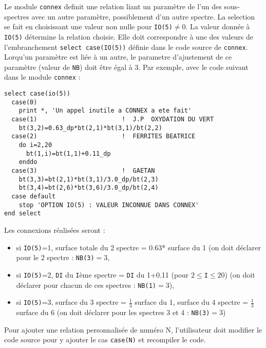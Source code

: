 Le module \lstinline{connex} definit une relation liant un paramètre de l'un des sous-spectres avec un autre paramètre, possiblement d'un autre spectre. 
La selection se fait en choisissant une valeur non nulle pour \lstinline{IO(5)}$\neq0$.
La valeur donnée à \lstinline{IO(5)} détermine la relation choisie.
Elle doit correspondre  à  une des valeurs de l'embranchement \lstinline{select case(IO(5))} définie dans le code source de \lstinline{connex}.
Lorqu'un paramètre est liée à un autre, le parametre d'ajustement de ce paramètre (valeur de \lstinline{NB}) doit être égal à $3$.
Par exemple, avec le code suivant dans le module \lstinline{connex} :
\begin{lstlisting}
select case(io(5))
  case(0) 
    print *, 'Un appel inutile a CONNEX a ete fait'
  case(1)                       !  J.P  OXYDATION DU VERT        
    bt(3,2)=0.63_dp*bt(2,1)*bt(3,1)/bt(2,2)
  case(2)                       !  FERRITES BEATRICE                                                
    do i=2,20
      bt(1,i)=bt(1,1)+0.11_dp
    enddo 
  case(3)                       !  GAETAN
    bt(3,3)=bt(2,1)*bt(3,1)/3.0_dp/bt(2,3)
    bt(3,4)=bt(2,6)*bt(3,6)/3.0_dp/bt(2,4)
  case default
    stop 'OPTION IO(5) : VALEUR INCONNUE DANS CONNEX'
end select
\end{lstlisting}

Les connexions réalisées seront :

  \begin{itemize}
    \item si \lstinline{IO(5)}=1,  surface totale du 2 spectre = 0.63* surface du 1 
          (on doit déclarer pour le 2 spectre : \lstinline{NB(3)}$=3$, 
    \item si \lstinline{IO(5)}=2,  \lstinline{DI} du \lstinline{I}ème spectre =  \lstinline{DI} du 1+0.11 (pour $2\le $\lstinline{I}$\le 20$)
     (on doit déclarer pour chacun de ces spectres : \lstinline{NB(1)}$=3$), 
    \item si \lstinline{IO(5)}=3, surface du 3 spectre = $\frac{1}{3}$ surface du 1,
    surface du 4 spectre = $\frac{1}{3}$ surface du 6
    (on doit déclarer pour les spectres 3 et 4 : \lstinline{NB(3)}$=3$)
  \end{itemize}


Pour ajouter une relation personnalisée de numéro N, l'utilisateur doit modifier le code source pour y ajouter le cas \lstinline{case(N)} et recompiler le code. 

